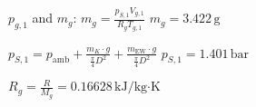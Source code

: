\( p_{g,1} \) and \( m_g \):  
\( m_g = \frac{p_{S,1} V_{g,1}}{R_g T_{g,1}} \)  
\( m_g = 3.422 \, \text{g} \)  

\( p_{S,1} = p_{\text{amb}} + \frac{m_K \cdot g}{\frac{\pi}{4} D^2} + \frac{m_{\text{EW}} \cdot g}{\frac{\pi}{4} D^2} \)  
\( p_{S,1} = 1.401 \, \text{bar} \)  

\( R_g = \frac{R}{M_g} = 0.16628 \, \text{kJ/kg·K} \)